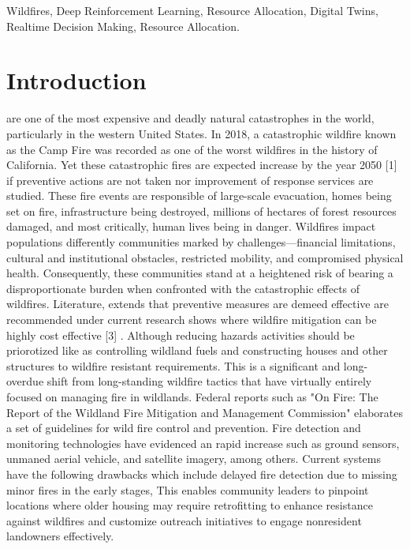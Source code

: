 \documentclass[lettersize,journal]{IEEEtran}
\begin{document}
\begin{IEEEkeywords}
Wildfires, Deep Reinforcement Learning, Resource Allocation, Digital Twins, Realtime Decision Making, Resource Allocation.
\end{IEEEkeywords}

\section{Introduction}\label{introduction}
 are one of the most expensive and deadly natural catastrophes in the world, particularly in the western United States. 
In 2018, a catastrophic wildfire known as the Camp Fire was recorded as one of the worst wildfires in the history of California. 
Yet these catastrophic fires are expected increase by the year 2050 [1] if preventive actions are not taken nor improvement of response services are studied. These fire events are responsible of large-scale evacuation, homes being set on fire, 
infrastructure being destroyed, millions of hectares of forest resources damaged, and most critically, human lives being in danger.
Wildfires impact populations differently communities marked by challenges—financial limitations, cultural and institutional obstacles, restricted mobility, and compromised physical health. 
Consequently, these communities stand at a heightened risk of bearing a disproportionate burden when confronted with the catastrophic effects of wildfires. 
Literature, extends that preventive measures are demeed effective are recommended under current
research shows where wildfire mitigation can be highly cost effective [3] . Although reducing hazards activities should be priorotized like as controlling wildland fuels and constructing houses and other structures to wildfire resistant requirements. 
This is a significant and long-overdue shift from long-standing wildfire tactics that have virtually entirely focused on managing fire in wildlands.
Federal reports such as "On Fire: The Report of the Wildland Fire Mitigation and Management Commission" elaborates a set of guidelines for wild fire control and prevention.
Fire detection and monitoring technologies have evidenced an rapid increase such as ground sensors, unmaned aerial vehicle, and satellite imagery, among others.
Current systems have the following drawbacks which include delayed fire detection due to missing minor fires in the early stages, 
This enables community leaders to pinpoint locations where older housing may require retrofitting to enhance resistance against wildfires and customize outreach initiatives to engage nonresident landowners effectively.
\end{document}
